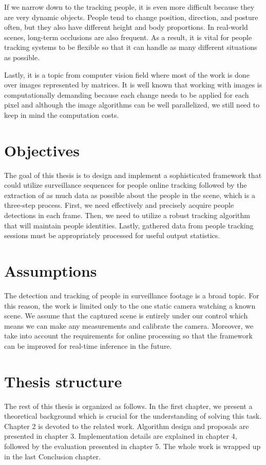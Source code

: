 \begin{introduction}
        If we narrow down to the tracking people, it is even more difficult because they are very dynamic objects. People tend to change position, direction, and posture often, but they also have different height and body proportions. In real-world scenes, long-term occlusions are also frequent. As a result, it is vital for people tracking systems to be flexible so that it can handle as many different situations as possible.  
        
        Lastly, it is a topic from computer vision field where most of the work is done over images represented by matrices. It is well known that working with images is computationally demanding because each change needs to be applied for each pixel and although the image algorithms can be well parallelized, we still need to keep in mind the computation costs. 
    
    \section{Objectives}
        The goal of this thesis is to design and implement a sophisticated framework that could utilize surveillance sequences for people online tracking followed by the extraction of as much data as possible about the people in the scene, which is a three-step process. First, we need effectively and precisely acquire people detections in each frame. Then, we need to utilize a robust tracking algorithm that will maintain people identities. Lastly, gathered data from people tracking sessions must be appropriately processed for useful output statistics.
    
    \section{Assumptions}   
        The detection and tracking of people in surveillance footage is a broad topic. For this reason, the work is limited only to the one static camera watching a known scene. We assume that the captured scene is entirely under our control which means we can make any measurements and calibrate the camera. Moreover, we take into account the requirements for online processing so that the framework can be improved for real-time inference in the future. 
    
    \section{Thesis structure}
        The rest of this thesis is organized as follows. In the first chapter, we present a theoretical background which is crucial for the understanding of solving this task. Chapter 2 is devoted to the related work. Algorithm design and proposals are presented in chapter 3. Implementation details are explained in chapter 4, followed by the evaluation presented in chapter 5. The whole work is wrapped up in the last Conclusion chapter.
    
\end{introduction}
